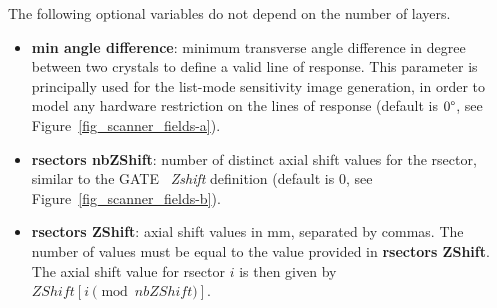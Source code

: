 \documentclass[a4paper, 11pt]{article}
\begin{document}
The following optional variables do not depend on the number of layers.
\begin{itemize}
  \item \textbf{min angle difference}: minimum transverse angle difference in degree between two crystals to define a valid line of response.
        This parameter is principally used for the list-mode sensitivity image generation, in order to model any hardware restriction on the lines of
        response (default is $0\degree$,  see Figure~\ref{fig_scanner_fields-a}).
  \item \textbf{rsectors nbZShift}: number of distinct axial shift values for the rsector, similar  to the GATE~\cite{GATE} \textit{Zshift} definition
        (default is 0, see Figure~\ref{fig_scanner_fields-b}). 
  \item \textbf{rsectors ZShift}: axial shift values in mm, separated by commas. The number of values must be equal to the value provided in
        \textbf{rsectors ZShift}. The axial shift value for rsector $i$ is then given by $ZShift[i \pmod{nbZShift}]$. 
\end{itemize}
\end{document}
